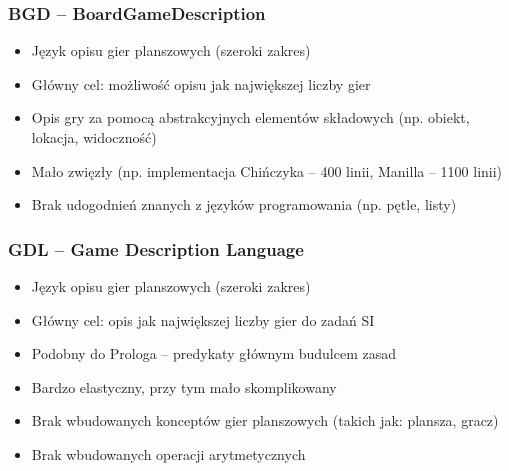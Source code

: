 \documentclass{beamer}
\begin{document}
\begin{frame}
	\frametitle{BGD -- BoardGameDescription\cite{BGD}}
	\begin{itemize}
		\item Język opisu gier planszowych (szeroki zakres)
		\item Główny cel: możliwość opisu jak największej liczby gier
		\item Opis gry za pomocą abstrakcyjnych elementów składowych (np. obiekt, lokacja, widoczność)
		\item Mało zwięzły (np. implementacja Chińczyka -- 400 linii, Manilla -- 1100 linii)
		\item Brak udogodnień znanych z języków programowania (np. pętle, listy)
	\end{itemize}
\end{frame}



\begin{frame}
	\frametitle{GDL -- Game Description Language\cite{GDL}}
	\begin{itemize}
		\item Język opisu gier planszowych (szeroki zakres)
		\item Główny cel: opis jak największej liczby gier do zadań SI
		\item Podobny do Prologa -- predykaty głównym budulcem zasad
		\item Bardzo elastyczny, przy tym mało skomplikowany
		\item Brak wbudowanych konceptów gier planszowych (takich jak: plansza, gracz)
		\item Brak wbudowanych operacji arytmetycznych
	\end{itemize}
\end{frame}
\end{document}
